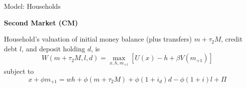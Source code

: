 \documentclass[10pt,english,slidetop,compress,
              blue,mathserif,color=option]{beamer}
\theoremstyle{plain}
\theoremstyle{definition}
\begin{document}
\begin{frame}[allowframebreaks]{Model: Households}




  \textbf{Second Market (CM)}

  \bigskip

  Household's valuation of initial money balance (plus transfers) $m+\tau_{2}M$,
  credit debt $l$, and deposit holding $d$, is
  \begin{equation*}
    W\left(m+\tau_{2}M,l,d\right)
    =
    \max_{x,h,m_{+1}}
    \left[
      U\left(x\right)-h+\beta V\left(m_{+1}\right)
    \right]
    \label{eq:CM value}
  \end{equation*}
  subject to
  \begin{equation*}
    x+\phi m_{+1}
    =
    wh+\phi\left(m+\tau_{2}M\right)
    +\phi\left(1+i_{d}\right)d-\phi\left(1+i\right)l + \Pi
    \label{eq:CM budget constraint}
  \end{equation*}



\end{frame}
\end{document}
